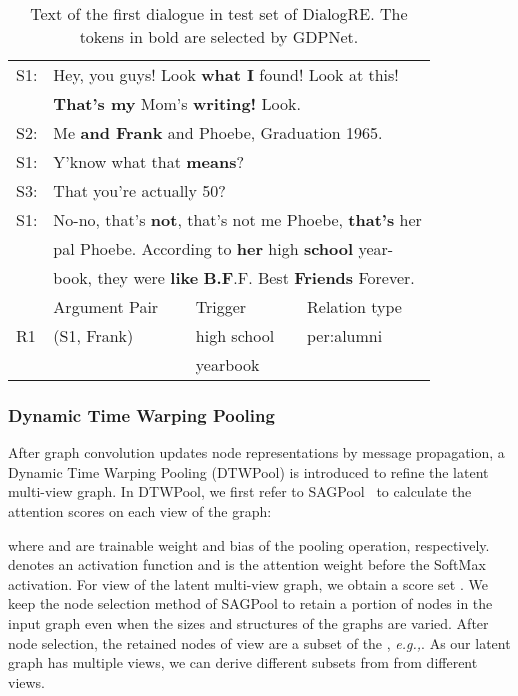 \documentclass[letterpaper]{article} \usepackage{aaai21}  \usepackage{times}  \usepackage{helvet} \usepackage{courier}  \usepackage[hyphens]{url}  \usepackage{graphicx} \urlstyle{rm} \def\UrlFont{\rm}  \usepackage{graphicx}  \usepackage{natbib}  \usepackage{caption}
\newcommand{\eg}{\emph{e.g.,}\xspace}
\begin{document}
\begin{table}
\caption{Text of the first dialogue in test set of DialogRE. The tokens in bold are selected by GDPNet.}
\label{tbl-dialog-case_study}
\centering
\begin{tabular}{llll}
\toprule
S1: & \multicolumn{3}{l}{Hey, you guys! Look \textbf{what I} found! Look at this!} \\
    & \multicolumn{3}{l}{\textbf{That’s my} Mom’s \textbf{writing!} Look.}    \\
S2: & \multicolumn{3}{l}{Me \textbf{and Frank} and Phoebe, Graduation 1965.}  \\
S1: & \multicolumn{3}{l}{Y'know what that \textbf{means}?}   \\
S3: & \multicolumn{3}{l}{That you’re actually 50?}               \\
S1: & \multicolumn{3}{l}{No-no, that’s \textbf{not}, that’s not me Phoebe, \textbf{that’s} her}     \\
    & \multicolumn{3}{l}{pal Phoebe. According to \textbf{her} high \textbf{school} year-}        \\
    & \multicolumn{3}{l}{book, they were \textbf{like} \textbf{B.F}.F. Best \textbf{Friends} Forever.} \\

\midrule
    & Argument Pair  & Trigger   & Relation type \\
R1  & (S1, Frank)         & high school  & per:alumni     \\
&            & yearbook                    &                         \\
\bottomrule
\end{tabular}
\end{table}


\subsubsection{Dynamic Time Warping Pooling} 
After graph convolution updates node representations by message propagation, a Dynamic Time Warping Pooling (DTWPool) is introduced to refine the latent multi-view graph. In DTWPool, we first refer to SAGPool~\cite{pmlr-v97-lee19c} to calculate the attention scores on each view of the graph:

where  and  are trainable weight and bias of the pooling operation, respectively.  denotes an activation function and  is the attention weight before the SoftMax activation. For  view of the latent multi-view graph, we obtain a score set . We keep the node selection method of SAGPool to retain a portion of nodes in the input graph even when the sizes and structures of the graphs are varied. After  node selection, the retained nodes of  view are a subset of the , \eg . As our latent graph has multiple views, we can derive different subsets from  from different views. 
\end{document}
